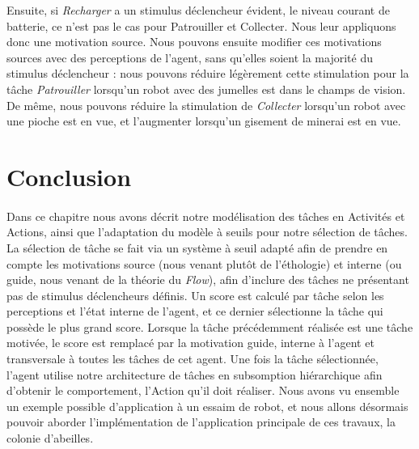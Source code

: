 		Ensuite, si \textit{Recharger} a un stimulus déclencheur évident, le niveau courant de batterie, ce n'est pas le cas pour Patrouiller et Collecter. Nous leur appliquons donc une motivation source. Nous pouvons ensuite modifier ces motivations sources avec des perceptions de l'agent, sans qu'elles soient la majorité du stimulus déclencheur : nous pouvons réduire légèrement cette stimulation pour la tâche \textit{Patrouiller} lorsqu'un robot avec des jumelles est dans le champs de vision. De même, nous pouvons réduire la stimulation de \textit{Collecter} lorsqu'un robot avec une pioche est en vue, et l'augmenter lorsqu'un gisement de minerai est en vue.
			
			
				
	\section*{Conclusion}
		\paragraph{}
		Dans ce chapitre nous avons décrit notre modélisation des tâches en Activités et Actions, ainsi que l'adaptation du modèle à seuils pour notre sélection de tâches. La sélection de tâche se fait via un système à seuil adapté afin de prendre en compte les motivations source (nous venant plutôt de l'éthologie) et interne (ou guide, nous venant de la théorie du \textit{Flow}), afin d'inclure des tâches ne présentant pas de stimulus déclencheurs définis. Un score est calculé par tâche selon les perceptions et l'état interne de l'agent, et ce dernier sélectionne la tâche qui possède le plus grand score. Lorsque la tâche précédemment réalisée est une tâche motivée, le score est remplacé par la motivation guide, interne à l'agent et transversale à toutes les tâches de cet agent. Une fois la tâche sélectionnée, l'agent utilise notre architecture de tâches en subsomption hiérarchique afin d'obtenir le comportement, l'Action qu'il doit réaliser. Nous avons vu ensemble un exemple possible d'application à un essaim de robot, et nous allons désormais pouvoir aborder l'implémentation de l'application principale de ces travaux, la colonie d'abeilles.

